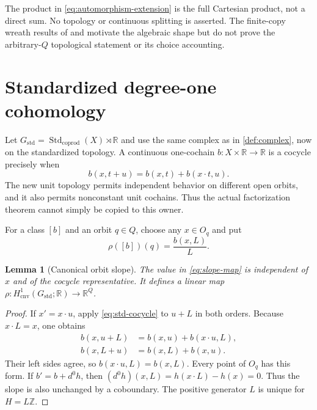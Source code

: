 \documentclass[11pt]{article}
\newtheorem{lemma}[theorem]{Lemma}
\theoremstyle{definition}
\newcommand{\R}{\mathbb R}
\newcommand{\Z}{\mathbb Z}
\newcommand{\Gstd}{G_{\mathrm{std}}}
\newcommand{\Hcnv}{H_{\mathrm{cnv}}}
\newcommand{\Std}{\operatorname{Std}_{\mathrm{coprod}}}
\begin{document}
The product in \cref{eq:automorphism-extension} is the full Cartesian
product, not a direct sum.  No topology or continuous splitting is asserted.
The finite-copy wreath results of \citet[Proposition~5.19,
printed p.~3311]{GuillouMay2017} and
\citet[Section~3.1, published p.~481]{AlpWensley2010} motivate the algebraic
shape but do not prove the arbitrary-$Q$ topological statement or its choice
accounting.

\section{Standardized degree-one cohomology}
\label{sec:standard-h1}

Let $\Gstd=\Std(X)\rtimes\R$ and use the same complex as in
\cref{def:complex}, now on the standardized topology.  A continuous
one-cochain $b:X\times\R\to\R$ is a cocycle precisely when
\begin{equation}
\label{eq:std-cocycle}
 b(x,t+u)=b(x,t)+b(x\mathbin{\cdot}t,u).
\end{equation}
The new unit topology permits independent behavior on different open
orbits, and it also permits nonconstant unit cochains.  Thus the actual
factorization theorem cannot simply be copied to this owner.

For a class $[b]$ and an orbit $q\in Q$, choose any $x\in O_q$ and put
\begin{equation}
\label{eq:slope-map}
 \rho([b])(q)=\frac{b(x,L)}{L}.
\end{equation}

\begin{lemma}[Canonical orbit slope]
\label{lem:slope}
The value in \cref{eq:slope-map} is independent of $x$ and of the cocycle
representative.  It defines a linear map
$\rho:\Hcnv^1(\Gstd;\R)\to\R^Q$.
\end{lemma}

\begin{proof}
If $x'=x\cdot u$, apply \cref{eq:std-cocycle} to $u+L$ in both orders.
Because $x\cdot L=x$, one obtains
\begin{align*}
 b(x,u+L)&=b(x,u)+b(x\cdot u,L),\\
 b(x,L+u)&=b(x,L)+b(x,u).
\end{align*}
Their left sides agree, so $b(x\cdot u,L)=b(x,L)$.  Every point of $O_q$
has this form.  If $b'=b+d^0h$, then
$(d^0h)(x,L)=h(x\cdot L)-h(x)=0$.  Thus the slope is also unchanged by a
coboundary.  The positive generator $L$ is unique for $H=L\Z$.
\end{proof}
\end{document}
